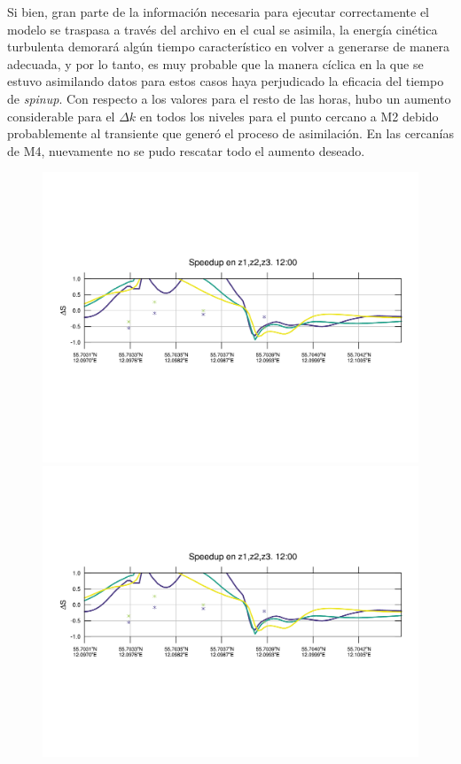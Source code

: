 Si bien, gran parte de la información necesaria para ejecutar correctamente el modelo se traspasa a través del archivo en el cual se asimila, la energía cinética turbulenta demorará algún tiempo característico en volver a generarse de manera adecuada, y por lo tanto, es muy probable que la manera cíclica en la que se estuvo asimilando datos para estos casos haya perjudicado la eficacia del tiempo de \emph{spinup}.
\newpage
Con respecto a los valores para el resto de las horas, hubo un aumento considerable para el $\Delta k$ en todos los niveles para el punto cercano a M2 debido probablemente al transiente que generó el proceso de asimilación. En las cercanías de M4, nuevamente no se pudo rescatar todo el aumento deseado.
\vspace*{\fill}
\begin{figure}[H]
	\centering
	\includegraphics[width=0.95\linewidth,trim={12mm 84mm 10mm 74mm},page=1,clip]{Imagenes/06/bol_da/speedup}\\%
	\includegraphics[width=0.95\linewidth,trim={12mm 84mm 10mm 74mm},page=13,clip]{Imagenes/06/bol_da/speedup}\\%

\end{figure}
